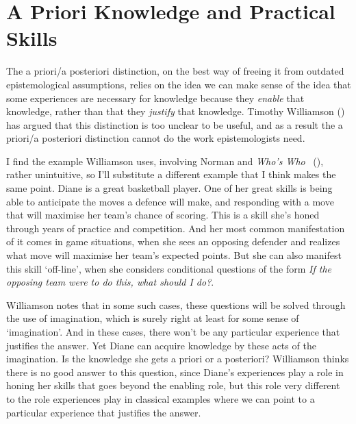 \documentclass[
  10pt,
  letterpaper,
  DIV=11,
  numbers=noendperiod,
  twoside]{scrartcl}
\begin{document}
\section{A Priori Knowledge and Practical
Skills}\label{aprioriknowledgeandpracticalskills}

The a priori/a posteriori distinction, on the best way of freeing it
from outdated epistemological assumptions, relies on the idea we can
make sense of the idea that some experiences are necessary for knowledge
because they \emph{enable} that knowledge, rather than that they
\emph{justify} that knowledge. Timothy Williamson
() has argued that this distinction
is too unclear to be useful, and as a result the a priori/a posteriori
distinction cannot do the work epistemologists need.

I find the example Williamson uses, involving Norman and \emph{Who's
Who} ~(), rather
unintuitive, so I'll substitute a different example that I think makes
the same point. Diane is a great basketball player. One of her great
skills is being able to anticipate the moves a defence will make, and
responding with a move that will maximise her team's chance of scoring.
This is a skill she's honed through years of practice and competition.
And her most common manifestation of it comes in game situations, when
she sees an opposing defender and realizes what move will maximise her
team's expected points. But she can also manifest this skill `off-line',
when she considers conditional questions of the form \emph{If the
opposing team were to do this, what should I do?}.

Williamson notes that in some such cases, these questions will be solved
through the use of imagination, which is surely right at least for some
sense of `imagination'. And in these cases, there won't be any
particular experience that justifies the answer. Yet Diane can acquire
knowledge by these acts of the imagination. Is the knowledge she gets a
priori or a posteriori? Williamson thinks there is no good answer to
this question, since Diane's experiences play a role in honing her
skills that goes beyond the enabling role, but this role very different
to the role experiences play in classical examples where we can point to
a particular experience that justifies the answer.
\end{document}
